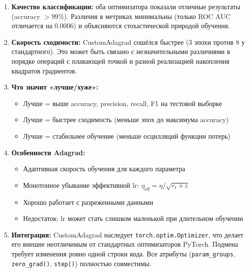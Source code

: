 \begin{enumerate}
    \item \textbf{Качество классификации:} оба оптимизатора показали
          отличные результаты (accuracy $> 99\%$). Различия в метриках
          минимальны (только ROC AUC отличается на 0.0006) и объясняются
          стохастической природой обучения.

    \item \textbf{Скорость сходимости:} CustomAdagrad сошёлся быстрее
          (3 эпохи против 8 у стандартного). Это может быть связано с
          незначительными различиями в порядке операций с плавающей точкой
          и разной реализацией накопления квадратов градиентов.

    \item \textbf{Что значит «лучше/хуже»:}
          \begin{itemize}
              \item Лучше = выше accuracy, precision, recall, F1 на тестовой выборке
              \item Лучше = быстрее сходимость (меньше эпох до максимума accuracy)
              \item Лучше = стабильнее обучение (меньше осцилляций функции потерь)
          \end{itemize}

    \item \textbf{Особенности Adagrad:}
          \begin{itemize}
              \item Адаптивная скорость обучения для каждого параметра
              \item Монотонное убывание эффективной lr: $\eta_{\text{eff}} = \eta / \sqrt{r_t + \varepsilon}$
              \item Хорошо работает с разреженными данными
              \item Недостаток: lr может стать слишком маленькой при длительном обучении
          \end{itemize}

    \item \textbf{Интеграция:} CustomAdagrad наследует \texttt{torch.optim.Optimizer},
          что делает его внешне неотличимым от стандартных оптимизаторов PyTorch.
          Подмена требует изменения ровно одной строки кода. Все атрибуты
          (\texttt{param\_groups}, \texttt{zero\_grad()}, \texttt{step()})
          полностью совместимы.
\end{enumerate}

